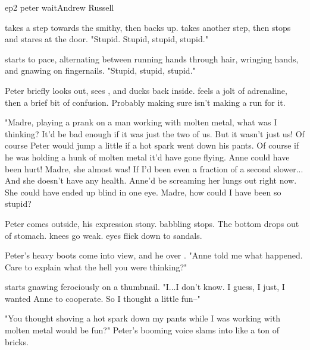 \documentclass{book}
\begin{document}
\begin{childnode}{ep2 peter wait}{Andrew Russell}


    \name{} takes a step towards the smithy, then backs up. \HeShe{} takes another step, then stops and stares at the door. "Stupid. Stupid, stupid, stupid."

    \HeShe{} starts to pace, alternating between running \hisher{} hands through \hisher{} hair, wringing \hisher{} hands, and gnawing on \hisher{} fingernails. "Stupid, stupid, stupid." 

    Peter briefly looks out, sees \name{}, and ducks back inside. \name{} feels a jolt of adrenaline, then a brief bit of confusion. Probably making sure \name{} isn't making a run for it. 

    "Madre, playing a prank on a man working with molten metal, what was I thinking? It'd be bad enough if it was just the two of us. But it wasn't just us! Of course Peter would jump a little if a hot spark went down his pants. Of course if he was holding a 
    hunk of molten metal it'd have gone flying.
    Anne could have been hurt! 
    Madre, she almost was! If I'd been even a fraction of a second slower... And she doesn't have any health. Anne'd be screaming her lungs out right now. She could have ended up blind in one eye. Madre, how could I have been so stupid? 

    Peter comes outside, his expression stony. \names{} babbling stops. The bottom drops out of \hisher{} stomach. \HisHer{} knees go weak. \HisHer{} eyes flick down to \hisher{} sandals.

    Peter's heavy boots come into \names{} view, and he  over \name{}. "Anne told me what happened. Care to explain what the hell you were thinking?" 

    \name{} starts gnawing ferociously on a thumbnail. "I...I don't know. I guess, I just, I wanted Anne to cooperate. So I thought a little fun--"

    "You thought shoving a hot spark down my pants while I was working with molten metal would be fun?" Peter's booming voice slams into \name{} like a ton of bricks. 


\end{childnode}
\end{document}
